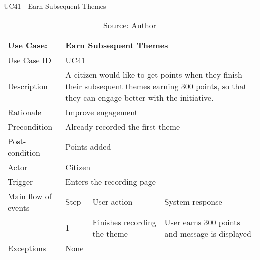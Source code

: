 \begin{table}[h]
\centering
\caption{UC41 - Earn Subsequent Themes}
\label{uc:41}
\begin{tabular}{|p{3cm}|p{1cm}|p{5cm}|p{5cm}|}
\hline
Use Case:       & \multicolumn{3}{p{11cm}|}{Earn Subsequent Themes} \\ \hline
Use Case ID     & \multicolumn{3}{p{11cm}|}{UC41} \\ \hline
Description     & \multicolumn{3}{p{11cm}|}{A citizen would like to get points when they finish their subsequent themes earning 300 points, so that they can engage better with the initiative.} \\ \hline
Rationale       & \multicolumn{3}{p{11cm}|}{Improve engagement} \\ \hline
Precondition    & \multicolumn{3}{p{11cm}|}{Already recorded the first theme} \\ \hline
Post-condition  & \multicolumn{3}{p{11cm}|}{Points added} \\ \hline
Actor           & \multicolumn{3}{p{11cm}|}{Citizen} \\ \hline
Trigger         & \multicolumn{3}{p{11cm}|}{Enters the recording page} \\ \hline
Main flow of events & Step  & User action & System response \\ \hline
                    & 1     & Finishes recording the theme & User earns 300 points and message is displayed \\ \hline
Exceptions      & \multicolumn{3}{p{11cm}|}{None} \\ \hline
\end{tabular}
\caption*{Source: Author}
\end{table}

